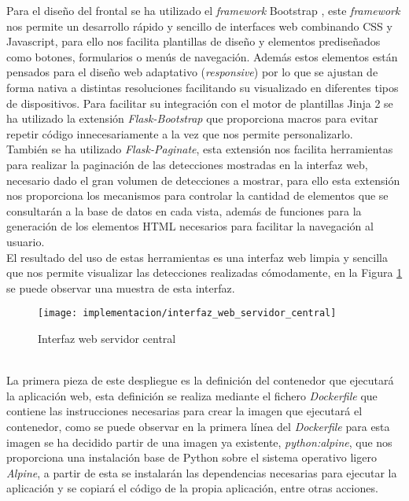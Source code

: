 \documentclass[../proyecto.tex]{subfiles}
\begin{document}
Para el diseño del frontal se  ha utilizado el \textit{framework} Bootstrap \cite{bootstrap_frontend_framework}, este \textit{framework} nos permite un desarrollo rápido y sencillo de interfaces web combinando CSS y Javascript, para ello nos facilita plantillas de diseño y elementos prediseñados como botones, formularios o menús de navegación. Además estos elementos están pensados para el diseño web adaptativo (\textit{responsive}) por lo que se ajustan de forma nativa a distintas resoluciones facilitando su visualizado en diferentes tipos de dispositivos. Para facilitar su integración con el motor de plantillas Jinja 2 se ha utilizado la extensión \textit{Flask-Bootstrap} \cite{flask_bootstrap} que proporciona macros para evitar repetir código innecesariamente a la vez que nos permite personalizarlo.\\

También se ha utilizado \textit{Flask-Paginate}, esta extensión nos facilita herramientas para realizar la paginación de las detecciones mostradas en la interfaz web, necesario dado el gran volumen de detecciones a mostrar, para ello esta extensión nos proporciona los mecanismos para controlar la cantidad de elementos que se consultarán a la base de datos en cada vista, además de funciones para la generación de los elementos HTML necesarios para facilitar la navegación al usuario. \\

El resultado del uso de estas herramientas es una interfaz web limpia y sencilla que nos permite visualizar las detecciones realizadas cómodamente, en la Figura \ref{fig:interfaz_web_servidor_central} se puede observar una muestra de esta interfaz.\\

\begin{figure}[H]
\centering
\texttt{[image: implementacion/interfaz\_web\_servidor\_central]}
\caption{Interfaz web servidor central}
\label{fig:interfaz_web_servidor_central}
\end{figure}

\\

La primera pieza de este despliegue es la definición del contenedor que ejecutará la aplicación web, esta definición se realiza mediante el fichero \textit{Dockerfile} que contiene las instrucciones necesarias para crear la imagen que ejecutará el contenedor, como se puede observar en la primera línea del \textit{Dockerfile} para esta imagen se ha decidido partir de una imagen ya existente, \textit{python:alpine}, que nos proporciona una instalación base de Python sobre el sistema operativo ligero \textit{Alpine}, a partir de esta se instalarán las dependencias necesarias para ejecutar la aplicación y se copiará el código de la propia aplicación, entre otras acciones.\\
\end{document}
